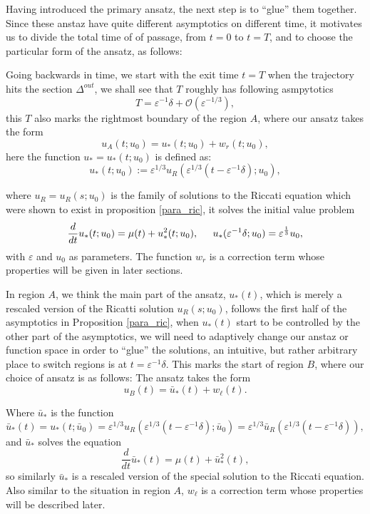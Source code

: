 \documentclass[letterpaper,11pt]{article}
\newcommand{\rmO}{\mathcal{O}}
\newcommand{\eps}{\varepsilon}
\numberwithin{equation}{section}
\theoremstyle{plain}
\begin{document}
Having introduced the primary ansatz, the next step is to ``glue'' them together. Since these anstaz have quite different asymptotics on different time, it motivates us to divide the total time of of passage, from $t=0$ to $t=T$, and to choose the particular form of the ansatz, as follows:

Going backwards in time, we start with the exit time $t=T$ when the trajectory hits the section $\Delta^{out}$, we shall see that $T$ roughly has following asmpytotics
\begin{equation}
T = \eps^{-1}\delta + \rmO(\eps^{-1/3}),
\end{equation}
this $T$ also marks the rightmost boundary of the region $A$, where our ansatz takes the form
\[
u_A(t; u_0) = u_*(t;u_0)  + w_r(t;u_0),
\]
here the function $u_* = u_*(t; u_0)$ is defined as:
\begin{equation}\label{urdef}
u_*(t; u_0) := \eps^{1/3}u_R(\eps^{1/3}(t-\eps^{-1}\delta); u_0),
\end{equation}

where $u_R=u_R(s; u_0)$ is the family of solutions to the Riccati equation which were shown to exist in proposition \ref{para_ric}, it solves the initial value problem
\begin{equation}\label{ureq}
\frac{d}{dt}u_*(t; u_0) = \mu(t) + u_*^2(t; u_0), \hspace{0.2in} u_*(\eps^{-1}\delta; u_0) = \eps^{\frac{1}{3}} u_0,
\end{equation}
with $\eps$ and $u_0$ as parameters.  The function $w_r$ is a correction term whose properties will be given in later sections. 

In region $A$, we think the main part of the ansatz, $u_*(t)$, which is merely a rescaled version of the Ricatti solution $u_R(s; u_0)$, follows the first half of the asymptotics in Proposition \ref{para_ric}, when $u_*(t)$ start to be controlled by the other part of the asymptotics, we will need to adaptively change our anstaz or function space in order to ``glue'' the solutions, an intuitive, but rather arbitrary place to switch regions is at $t = \eps^{-1} \delta$. This marks the start of region $B$, where our choice of ansatz is as follows:
 The ansatz takes the form 
 \[ 
 u_B(t) = \bar{u}_*(t)  +w_\ell(t).
\]

Where $\bar{u}_*$ is the function
\begin{equation}\label{uldef}
\bar{u}_*(t) = u_*(t;\bar{u}_0) = \eps^{1/3} u_R( \eps^{1/3}(t-\eps^{-1}\delta); \bar{u}_0)=\eps^{1/3}\bar{u}_R(\eps^{1/3}(t-\eps^{-1}\delta)),
\end{equation}
and $\bar{u}_*$ solves the equation
\begin{equation}\label{uleq}
\frac{d}{dt}\bar{u}_* (t) = \mu(t) + \bar{u}_*^2(t),
\end{equation}
so similarly $\bar{u}_*$ is a rescaled version of the special solution to the Riccati equation. Also similar to the situation in region $A$, $w_\ell$ is a correction term whose properties will be described later.
\end{document}
